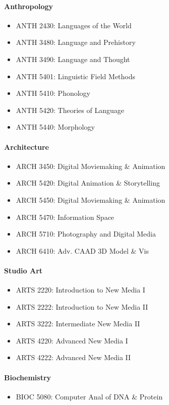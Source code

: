 \documentclass[10pt,letter]{book}
\newenvironment{itemlist}{
\begin{itemize}
\setlength{\itemsep}{0pt}
\setlength{\parskip}{0pt}}
{\end{itemize}}
\begin{document}
\paragraph{Anthropology}
\begin{itemlist}
\item ANTH 2430: Languages of the World
\item ANTH 3480: Language and Prehistory
\item ANTH 3490: Language and Thought
\item ANTH 5401: Linguistic Field Methods
\item ANTH 5410: Phonology
\item ANTH 5420: Theories of Language
\item ANTH 5440: Morphology
\end{itemlist}

\paragraph{Architecture}
\begin{itemlist}
\item ARCH 3450: Digital Moviemaking \& Animation
\item ARCH 5420: Digital Animation \& Storytelling
\item ARCH 5450: Digital Moviemaking \& Animation
\item ARCH 5470: Information Space
\item ARCH 5710: Photography and Digital Media
\item ARCH 6410: Adv. CAAD 3D Model \& Vis
\end{itemlist}

\paragraph{Studio Art}
\begin{itemlist}
\item ARTS 2220: Introduction to New Media I
\item ARTS 2222: Introduction to New Media II
\item ARTS 3222: Intermediate New Media II
\item ARTS 4220: Advanced New Media I
\item ARTS 4222: Advanced New Media II
\end{itemlist}

\paragraph{Biochemistry}
\begin{itemlist}
\item BIOC 5080: Computer Anal of DNA \& Protein
\end{itemlist}
\end{document}

